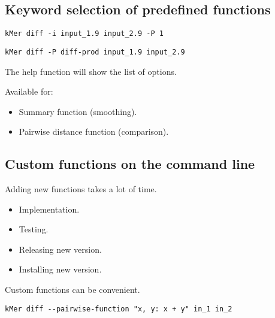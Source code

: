 \documentclass[slidestop]{beamer}
\begin{document}
\subsection{Keyword selection of predefined functions}
\begin{pframe}
  \begin{lstlisting}[caption={Old style function selection.}]
    kMer diff -i input_1.9 input_2.9 -P 1
  \end{lstlisting}
  
  \begin{lstlisting}[caption={New style function selection.}]
    kMer diff -P diff-prod input_1.9 input_2.9
  \end{lstlisting}

  The help function will show the list of options.
  \bigskip
  \pause

  Available for:
  \begin{itemize}
    \item Summary function (smoothing).
    \item Pairwise distance function (comparison).
  \end{itemize}
\end{pframe}

\subsection{Custom functions on the command line}
\begin{pframe}
  Adding new functions takes a lot of time.
  \begin{itemize}
    \item Implementation.
    \item Testing.
    \item Releasing new version.
    \item Installing new version.
  \end{itemize}
  \bigskip
  \pause

  Custom functions can be convenient.
  \medskip

  \begin{lstlisting}[caption={Custom function selection.}]
    kMer diff --pairwise-function "x, y: x + y" in_1 in_2
  \end{lstlisting}
\end{pframe}
\end{document}
